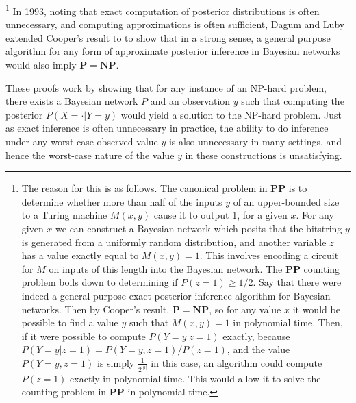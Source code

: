 \documentclass{article}
\renewcommand{\P}{\mathbf{P}}
\newcommand{\NP}{\mathbf{NP}}
\def \PP{\P\P}
\theoremstyle{definition}
\theoremstyle{remark}
\begin{document}
\footnote{
The reason for this is as follows.
The canonical problem in $\PP$ is to determine whether more than half of the inputs $y$ of an upper-bounded size to a Turing machine $M(x, y)$ cause it to output 1, for a given $x$.
For any given $x$ we can construct a Bayesian network which posits that the bitstring $y$ is generated from a uniformly random distribution, and another variable $z$ has a value exactly equal to $M(x, y) = 1$.
This involves encoding a circuit for $M$ on inputs of this length into the Bayesian network.
The $\PP$ counting problem boils down to determining if $P(z = 1) \geq 1/2$.
Say that there were indeed a general-purpose exact posterior inference algorithm for Bayesian networks.
Then by Cooper's result, $\P = \NP$, so for any value $x$ it would be possible to find a value $y$ such that $M(x, y) = 1$ in polynomial time.
Then, if it were possible to compute $P(Y = y | z = 1)$ exactly,
because $P(Y = y | z = 1) = P(Y = y, z = 1) / P(z = 1)$, and the value $P(Y = y, z = 1)$ is simply $\frac{1}{2^{|y|}}$ in this case,
an algorithm could compute $P(z = 1)$ exactly in polynomial time.
This would allow it to solve the counting problem in $\PP$ in polynomial time.
}
In 1993, noting that exact computation of posterior distributions is often unnecessary, and computing approximations is often sufficient, Dagum and Luby \cite{dagum1993} extended Cooper's result to to show that in a strong sense, a general purpose algorithm for any form of approximate posterior inference in Bayesian networks would also imply $\P = \NP$.

These proofs work by showing that for any instance of an NP-hard problem, there exists a Bayesian network $P$ and an observation $y$ such that computing the posterior $P(X = \cdot | Y = y)$ would yield a solution to the NP-hard problem.
Just as exact inference is often unnecessary in practice, the ability to do inference under any worst-case observed value $y$ is also unnecessary in many settings, and hence the worst-case nature of the value $y$ in these constructions is unsatisfying.
\end{document}
